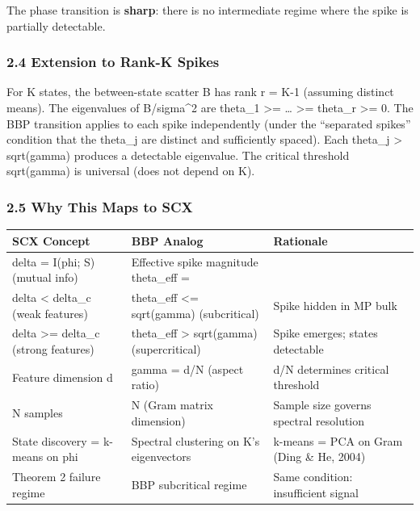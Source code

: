 \documentclass[
  12pt,
]{article}
\begin{document}
The phase transition is \textbf{sharp}: there is no intermediate regime
where the spike is partially detectable.

\subsubsection{2.4 Extension to Rank-K
Spikes}\label{extension-to-rank-k-spikes}

For K states, the between-state scatter B has rank r = K-1 (assuming
distinct means). The eigenvalues of B/sigma\^{}2 are theta\_1
\textgreater= \ldots{} \textgreater= theta\_r \textgreater= 0. The BBP
transition applies to each spike independently (under the ``separated
spikes'' condition that the theta\_j are distinct and sufficiently
spaced). Each theta\_j \textgreater{} sqrt(gamma) produces a detectable
eigenvalue. The critical threshold sqrt(gamma) is universal (does not
depend on K).

\subsubsection{2.5 Why This Maps to SCX}\label{why-this-maps-to-scx}

\begin{longtable}[]{@{}
  >{\raggedright\arraybackslash}p{}
  >{\raggedright\arraybackslash}p{}
  >{\raggedright\arraybackslash}p{}@{}}
\toprule\noalign{}
\begin{minipage}[b]{\linewidth}\raggedright
SCX Concept
\end{minipage} & \begin{minipage}[b]{\linewidth}\raggedright
BBP Analog
\end{minipage} & \begin{minipage}[b]{\linewidth}\raggedright
Rationale
\end{minipage} \\
\midrule\noalign{}
\endhead
\bottomrule\noalign{}
\endlastfoot
delta = I(phi; S) (mutual info) & Effective spike magnitude theta\_eff =
& \\
delta \textless{} delta\_c (weak features) & theta\_eff \textless=
sqrt(gamma) (subcritical) & Spike hidden in MP bulk \\
delta \textgreater= delta\_c (strong features) & theta\_eff
\textgreater{} sqrt(gamma) (supercritical) & Spike emerges; states
detectable \\
Feature dimension d & gamma = d/N (aspect ratio) & d/N determines
critical threshold \\
N samples & N (Gram matrix dimension) & Sample size governs spectral
resolution \\
State discovery = k-means on phi & Spectral clustering on K's
eigenvectors & k-means = PCA on Gram (Ding \& He, 2004) \\
Theorem 2 failure regime & BBP subcritical regime & Same condition:
insufficient signal \\
\end{longtable}
\end{document}
